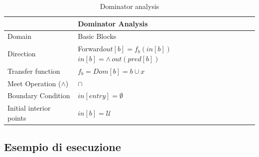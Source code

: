 \documentclass[10pt,a4paper]{article}
\begin{document}
\begin{table}[h!]
  \centering
  \begin{tabular}{|l|p{4cm}|}
    \hline
    \textbf{} & \textbf{Dominator Analysis} \\
    \hline
    Domain & Basic Blocks\\
    \hline
    Direction & Forward\newline $out[b]=f_{b}(in[b])$\newline $in[b]=\wedge\, out(pred[b])$\\
    \hline
    Transfer function & $f_b = Dom[b] = b \cup x$\\
    \hline
    Meet Operation (\(\land\)) & $\cap$ \\
    \hline
    Boundary Condition & $in[entry] = \emptyset $\\
    \hline
    Initial interior points & $in[b] = \mathcal{U} $ \\
    \hline
  \end{tabular}
  \caption{Dominator analysis}
\end{table}

\subsection{Esempio di esecuzione}
\end{document}
